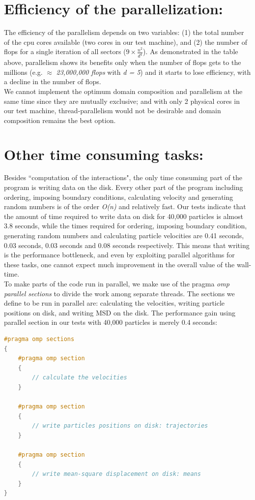 \documentclass[a4paper,11pt]{article}
\begin{document}
\section*{Efficiency of the parallelization:}
The efficiency of the parallelism depends on two variables: (1) the total number of the cpu cores available (two cores in our test machine), and (2) the number of flops for a single iteration of all sectors ($9 \times \frac{n^2}{d^4}$). As demonstrated in the table above, parallelism shows its benefits only when the number of flops gets to the millions (e.g. $\approx$ \emph{23,000,000 flops} with \emph{d = 5}) and it starts to lose efficiency, with a decline in the number of flops. \\
We cannot implement the optimum domain composition and parallelism at the same time since they are mutually exclusive; and with only 2 physical cores in our test machine, thread-parallelism would not be desirable and domain composition remains the best option.

\newpage
\section*{Other time consuming tasks:}
Besides ``computation of the interactions", the only time consuming part of the program is writing data on the disk. Every other part of the program including ordering, imposing boundary conditions, calculating velocity and generating random numbers is of the order \emph{O(n)} and relatively fast. Our tests indicate that the amount of time required to write data on disk for 40,000 particles is almost 3.8 seconds, while the times required for ordering, imposing boundary condition, generating random numbers and calculating particle velocities are 0.41 seconds, 0.03 seconds, 0.03 seconds and 0.08 seconds respectively. This means that writing is the performance bottleneck, and even by exploiting parallel algorithms for these tasks, one cannot expect much improvement in the overall value of the wall-time. \\
To make parts of the code run in parallel, we make use of the pragma \emph{omp parallel sections} to divide the work among separate threads. The sections we define to be run in parallel are: calculating the velocities, writing particle positions on disk, and writing MSD on the disk. The performance gain using parallel section in our tests with 40,000 particles is merely 0.4 seconds:

\begin{lstlisting}[basicstyle=\tiny,language=C++]
#pragma omp sections
{
    #pragma omp section
    {
        // calculate the velocities
    }

    #pragma omp section
    {
        // write particles positions on disk: trajectories
    }

    #pragma omp section
    {
        // write mean-square displacement on disk: means
    }
}
\end{lstlisting}
\end{document}
